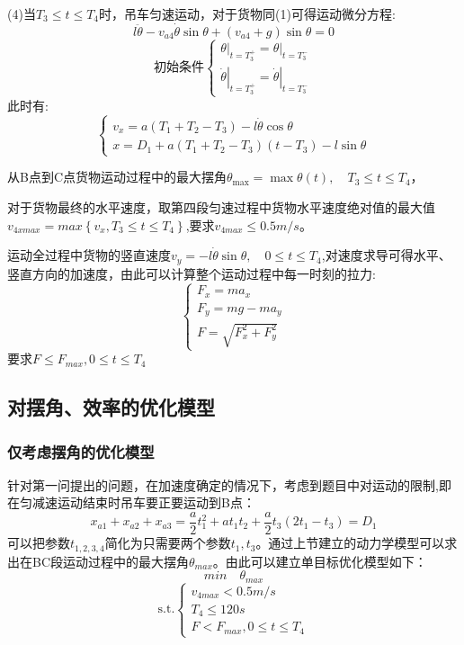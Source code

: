 \documentclass[withoutpreface,bwprint]{cumcmthesis} %
\begin{document}
(4)当$T_3 \leq t \leq T_4$时，吊车匀速运动，对于货物同(1)可得运动微分方程:
$$l\ddot{\theta}-v_{a4}\dot{\theta}\sin\theta+(v_{a4}+g) \sin \theta=0$$
$$\text{初始条件}\left \{\begin{array}{l}
        \left.\theta\right|_{t=T_{3}^{+}}=\left.\theta\right|_{t=T_{3}^{-}} \\
        \left.\dot{\theta}\right|_{t=T_{3}^{+}}=\left.\dot{\theta}\right|_{t=T_{3}^{-}}
    \end{array}\right.$$
此时有:$$\left\{\begin{array}{l}
        v_{x}=a\left(T_1+T_{2}-T_{3}\right)-l \dot{\theta} \cos \theta \\
        x=D_1+a\left(T_{1}+T_{2}-T_{3}\right)\left(t-T_{3}\right)-l \sin \theta
    \end{array}\right.$$

从B点到C点货物运动过程中的最大摆角$\theta_{\max }=\max \theta(t), \quad T_3 \leqslant t \leqslant T_{4}$，

对于货物最终的水平速度，取第四段匀速过程中货物水平速度绝对值的最大值$v_{4xmax}=max\left \{v_{x},T_3 \leq t \leq T_4\right \}$,要求$v_{4max} \leq 0.5m/s$。

运动全过程中货物的竖直速度$v_{y}=-l\dot{\theta}\sin\theta,\quad 0\leq t\leq T_4$,对速度求导可得水平、竖直方向的加速度，由此可以计算整个运动过程中每一时刻的拉力:$$\left\{\begin{array}{l}
        F_{x}=m a_{x}   \\
        F_{y}=mg-ma_{y} \\
        F=\sqrt{F_{x}^2 + F_{y}^2}
    \end{array}\right.$$
要求$F \leq F_{max},0 \leq t \leq T_4$

\subsection{对摆角、效率的优化模型}
\subsubsection{仅考虑摆角的优化模型}
针对第一问提出的问题，在加速度确定的情况下，考虑到题目中对运动的限制,即在匀减速运动结束时吊车要正要运动到B点：$$x_{a1}+x_{a2}+x_{a3}=\frac{a}{2}t_1^2+at_1t_2+\frac{a}{2}t_3(2t_1-t_3)=D_1$$可以把参数$t_{1,2,3,4}$简化为只需要两个参数$t_1,t_3$。通过上节建立的动力学模型可以求出在BC段运动过程中的最大摆角$\theta_{max}$。由此可以建立单目标优化模型如下：
$$min\quad \theta_{max}$$
$$\text{s.t.}\left \{\begin{array}{l}
    v_{4max}<0.5m/s \\
    T_4\leq120s \\
    F<F_{max},0\leq t\leq T_4
\end{array}\right.$$
\end{document}
